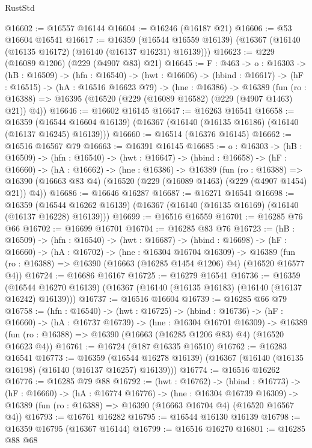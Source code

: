 \begin{lexlean}{RustStd}
\begin{coremodule}
@16602 := @16557 @16144
@16604 := @16246 (@16187 @21)
@16606 := @53 @16604 @16541
@16617 := @16359
    (@16544 @16559 @16139)
    (@16367 (@16140 (@16135 @16172) (@16140 (@16137 @16231) @16139)))
@16623 := @229 (@16089 @1206) (@229 (@4907 @83) @21)
@16645 := {F : @463} ->
  {o : @16303} ->
  (hB : @16509) ->
  (hfn : @16540) ->
  (hwt : @16606) ->
  (hbind : @16617) ->
  (hF : @16515) ->
  (hA : @16516 @16623 @79) ->
  (hne : @16386) ->
  @16389 (fun (ro : @16388) => @16395 (@16520 (@229 (@16089 @16582) (@229 (@4907 @1463) @21)) @4))
@16646 := @16602 @16145
@16647 := @16263 @16541
@16658 := @16359
    (@16544 @16604 @16139)
    (@16367 (@16140 (@16135 @16186) (@16140 (@16137 @16245) @16139)))
@16660 := @16514 (@16376 @16145)
@16662 := @16516 @16567 @79
@16663 := @16391 @16145
@16685 := {o : @16303} ->
  (hB : @16509) ->
  (hfn : @16540) ->
  (hwt : @16647) ->
  (hbind : @16658) ->
  (hF : @16660) ->
  (hA : @16662) ->
  (hne : @16386) ->
  @16389
    (fun (ro : @16388) =>
    @16390 (@16663 @83 @4) (@16520 (@229 (@16089 @1463) (@229 (@4907 @1454) @21)) @4))
@16686 := @16646 @16287
@16687 := @16271 @16541
@16698 := @16359
    (@16544 @16262 @16139)
    (@16367 (@16140 (@16135 @16169) (@16140 (@16137 @16228) @16139)))
@16699 := @16516 @16559
@16701 := @16285 @76 @66
@16702 := @16699 @16701
@16704 := @16285 @83 @76
@16723 := (hB : @16509) ->
  (hfn : @16540) ->
  (hwt : @16687) ->
  (hbind : @16698) ->
  (hF : @16660) ->
  (hA : @16702) ->
  (hne : @16304 @16704 @16309) ->
  @16389 (fun (ro : @16388) => @16390 (@16663 (@16285 @1454 @1206) @4) (@16520 @16577 @4))
@16724 := @16686 @16167
@16725 := @16279 @16541
@16736 := @16359
    (@16544 @16270 @16139)
    (@16367 (@16140 (@16135 @16183) (@16140 (@16137 @16242) @16139)))
@16737 := @16516 @16604
@16739 := @16285 @66 @79
@16758 := (hfn : @16540) ->
  (hwt : @16725) ->
  (hbind : @16736) ->
  (hF : @16660) ->
  (hA : @16737 @16739) ->
  (hne : @16304 @16701 @16309) ->
  @16389 (fun (ro : @16388) => @16390 (@16663 (@16285 @1206 @83) @4) (@16520 @16623 @4))
@16761 := @16724 (@187 @16335 @16510)
@16762 := @16283 @16541
@16773 := @16359
    (@16544 @16278 @16139)
    (@16367 (@16140 (@16135 @16198) (@16140 (@16137 @16257) @16139)))
@16774 := @16516 @16262
@16776 := @16285 @79 @88
@16792 := (hwt : @16762) ->
  (hbind : @16773) ->
  (hF : @16660) ->
  (hA : @16774 @16776) ->
  (hne : @16304 @16739 @16309) ->
  @16389 (fun (ro : @16388) => @16390 (@16663 @16704 @4) (@16520 @16567 @4))
@16793 := @16761 @16282
@16795 := @16544 @16130 @16139
@16798 := @16359 @16795 (@16367 @16144)
@16799 := @16516 @16270
@16801 := @16285 @88 @68

\end{coremodule}
\end{lexlean}
